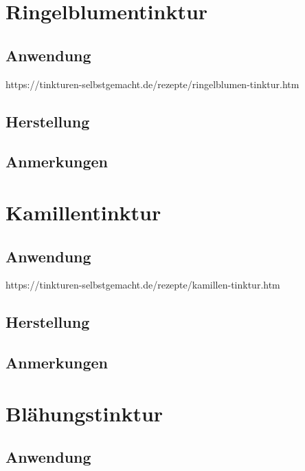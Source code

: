 \section{Ringelblumentinktur}

\subsection{Anwendung}

https://tinkturen-selbstgemacht.de/rezepte/ringelblumen-tinktur.htm

\subsection{Herstellung}

\subsection{Anmerkungen}






\section{Kamillentinktur}

\subsection{Anwendung}

https://tinkturen-selbstgemacht.de/rezepte/kamillen-tinktur.htm

\subsection{Herstellung}

\subsection{Anmerkungen}







\section{Blähungstinktur}

\subsection{Anwendung}


